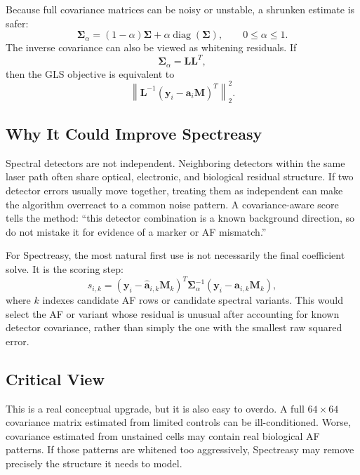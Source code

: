 \documentclass[11pt]{article}
\newcommand{\y}{\mathbf{y}}
\newcommand{\M}{\mathbf{M}}
\newcommand{\aev}{\mathbf{a}}
\newcommand{\Sig}{\boldsymbol{\Sigma}}
\begin{document}
Because full covariance matrices can be noisy or unstable, a shrunken estimate
is safer:
\begin{equation}
  \Sig_{\alpha}
  =
  (1-\alpha)\Sig
  +
  \alpha \operatorname{diag}(\Sig),
  \qquad
  0 \leq \alpha \leq 1.
\end{equation}
The inverse covariance can also be viewed as whitening residuals. If
\begin{equation}
  \Sig_{\alpha} = \mathbf{L}\mathbf{L}^T,
\end{equation}
then the GLS objective is equivalent to
\begin{equation}
  \left\|
    \mathbf{L}^{-1}
    \left(\y_i - \aev_i\M\right)^T
  \right\|_2^2.
\end{equation}

\subsection*{Why It Could Improve Spectreasy}

Spectral detectors are not independent. Neighboring detectors within the same
laser path often share optical, electronic, and biological residual structure.
If two detector errors usually move together, treating them as independent can
make the algorithm overreact to a common noise pattern. A covariance-aware score
tells the method: ``this detector combination is a known background direction,
so do not mistake it for evidence of a marker or AF mismatch.''

For Spectreasy, the most natural first use is not necessarily the final
coefficient solve. It is the scoring step:
\begin{equation}
  s_{i,k}
  =
  \left(\y_i - \hat{\aev}_{i,k}\M_k\right)^T
  \Sig_{\alpha}^{-1}
  \left(\y_i - \hat{\aev}_{i,k}\M_k\right),
\end{equation}
where \(k\) indexes candidate AF rows or candidate spectral variants. This would
select the AF or variant whose residual is unusual after accounting for known
detector covariance, rather than simply the one with the smallest raw squared
error.

\subsection*{Critical View}

This is a real conceptual upgrade, but it is also easy to overdo. A full
\(64 \times 64\) covariance matrix estimated from limited controls can be
ill-conditioned. Worse, covariance estimated from unstained cells may contain
real biological AF patterns. If those patterns are whitened too aggressively,
Spectreasy may remove precisely the structure it needs to model.
\end{document}
